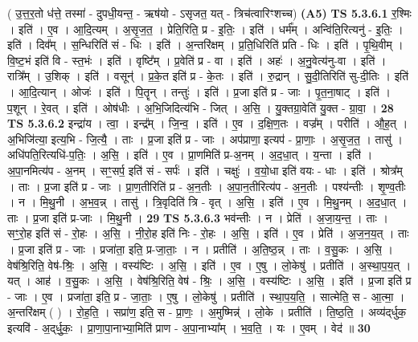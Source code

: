 \documentclass[17pt]{extarticle}
\begin{document}
                  \newline
                      ( उ॒त्त॒र॒तो ध॑त्ते॒ तस्मा॑ - दुपधी॒यन्त॒ - ऋष॑यो - ऽसृजत॒ यत् - त्रिच॑त्वारिꣳशच्च)  \textbf{(A5)} \newline \newline
                                \textbf{ TS 5.3.6.1} \newline
                  र॒श्मिः । इति॑ । ए॒व । आ॒दि॒त्यम् । अ॒सृ॒ज॒त॒ । प्रेति॒रिति॒ प्र - इ॒तिः॒ । इति॑ । धर्म᳚म् । अन्वि॑ति॒रित्यनु॑ - इ॒तिः॒ । इति॑ । दिव᳚म् । स॒न्धिरिति॑ सं - धिः । इति॑ । अ॒न्तरि॑क्षम् । प्र॒ति॒धिरिति॑ प्रति - धिः । इति॑ । पृ॒थि॒वीम् । वि॒ष्ट॒भं इति॑ वि - स्त॒भंः । इति॑ । वृष्टि᳚म् । प्र॒वेति॑ प्र - वा । इति॑ । अहः॑ । अ॒नु॒वेत्य॑नु-वा । इति॑ । रात्रि᳚म् । उ॒शिक् । इति॑ । वसून्॑ । प्र॒के॒त इति॑ प्र - के॒तः । इति॑ । रु॒द्रान् । सु॒दी॒तिरिति॑ सु-दी॒तिः । इति॑ । आ॒दि॒त्यान् । ओजः॑ । इति॑ । पि॒तॄन् । तन्तुः॑ । इति॑ । प्र॒जा इति॑ प्र - जाः । पृ॒त॒ना॒षाट् । इति॑ । प॒शून् । रे॒वत् । इति॑ । ओष॑धीः । अ॒भि॒जिदित्य॑भि - जित् । अ॒सि॒ । यु॒क्तग्रा॒वेति॑ यु॒क्त - ग्रा॒वा॒ । \textbf{  28} \newline
                  \newline
                                \textbf{ TS 5.3.6.2} \newline
                  इन्द्रा॑य । त्वा॒ । इन्द्र᳚म् । जि॒न्व॒ । इति॑ । ए॒व । द॒क्षि॒ण॒तः । वज्र᳚म् । परीति॑ । औ॒ह॒त् । अ॒भिजि॑त्या॒ इत्य॒भि - जि॒त्यै॒ । ताः । प्र॒जा इति॑ प्र - जाः । अप॑प्राणा॒ इत्यप॑ - प्रा॒णाः॒ । अ॒सृ॒ज॒त॒ । तासु॑ । अधि॑पति॒रित्यधि॑-प॒तिः॒ । अ॒सि॒ । इति॑ । ए॒व । प्रा॒णमिति॑ प्र-अ॒नम् । अ॒द॒धा॒त् । य॒न्ता । इति॑ । अ॒पा॒नमित्य॑प - अ॒नम् । सꣳ॒॒सर्प॒ इति॑ सं - सर्पः॑ । इति॑ । चक्षुः॑ । व॒यो॒धा इति॑ वयः - धाः । इति॑ । श्रोत्र᳚म् । ताः । प्र॒जा इति॑ प्र - जाः । प्रा॒ण॒तीरिति॑ प्र - अ॒न॒तीः । अ॒पा॒न॒तीरित्य॑प - अ॒न॒तीः । पश्य॑न्तीः । शृ॒ण्व॒तीः । न । मि॒थु॒नी । अ॒भ॒व॒न्न् । तासु॑ । त्रि॒वृदिति॑ त्रि - वृत् । अ॒सि॒ । इति॑ । ए॒व । मि॒थु॒नम् । अ॒द॒धा॒त् । ताः । प्र॒जा इति॑ प्र-जाः । मि॒थु॒नी । \textbf{  29} \newline
                  \newline
                                \textbf{ TS 5.3.6.3} \newline
                  भव॑न्तीः । न । प्रेति॑ । अ॒जा॒य॒न्त॒ । ताः । सꣳ॒॒रो॒ह इति॑ सं - रो॒हः । अ॒सि॒ । नी॒रो॒ह इति॑ निः - रो॒हः । अ॒सि॒ । इति॑ । ए॒व । प्रेति॑ । अ॒ज॒न॒य॒त् । ताः । प्र॒जा इति॑ प्र - जाः । प्रजा॑ता॒ इति॒ प्र-जा॒ताः॒ । न । प्रतीति॑ । अ॒ति॒ष्ठ॒न्न् । ताः । व॒सु॒कः । अ॒सि॒ । वेष॑श्रि॒रिति॒ वेष॑-श्रिः॒ । अ॒सि॒ । वस्य॑ष्टिः । अ॒सि॒ । इति॑ । ए॒व । ए॒षु । लो॒केषु॑ । प्रतीति॑ । अ॒स्था॒प॒य॒त् । यत् । आह॑ । व॒सु॒कः । अ॒सि॒ । वेष॑श्रि॒रिति॒ वेष॑ - श्रिः॒ । अ॒सि॒ । वस्य॑ष्टिः । अ॒सि॒ । इति॑ । प्र॒जा इति॑ प्र - जाः । ए॒व । प्रजा॑ता॒ इति॒ प्र - जा॒ताः॒ । ए॒षु । लो॒केषु॑ । प्रतीति॑ । स्था॒प॒य॒ति॒ । सात्मेति॒ स - आ॒त्मा॒ । अ॒न्तरि॑क्षम् ( ) । रो॒ह॒ति॒ । सप्रा॑ण॒ इति॒ स - प्रा॒णः॒ । अ॒मुष्मिन्न्॑ । लो॒के । प्रतीति॑ । ति॒ष्ठ॒ति॒ । अव्य॑द्‌र्धुक॒ इत्यवि॑ - अ॒द्‌र्धु॒कः॒ । प्रा॒णा॒पा॒नाभ्या॒मिति॑ प्राण - अ॒पा॒नाभ्या᳚म् । भ॒व॒ति॒ । यः । ए॒वम् । वेद॑ ॥ \textbf{  30} \newline
\end{document}
